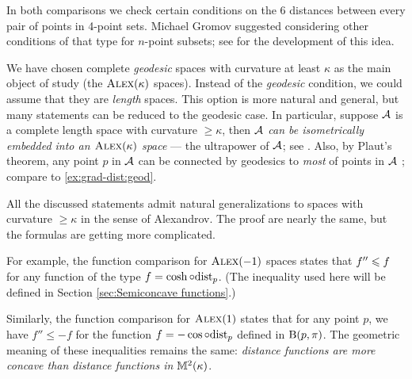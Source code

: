 In both comparisons we check certain conditions on the 6 distances between every pair of points in 4-point sets.
Michael Gromov \cite[Section 1.19$_+$]{gromov1999} suggested considering other conditions of that type for $n$-point subsets;
see \cite{toyoda,lebedeva-petrunin-zolotov,lebedeva2019,petrunin2017,lebedeva-petrunin2024,lebedeva-petrunin2023,lebedeva-petrunin2021,lebedeva-petrunin2025,eskenazis-mendel-naor,gromov2001} for the development of this idea.

We have chosen complete \textit{geodesic} spaces with curvature at least $\kappa$ as the main object of study (the $\textsc{Alex}(\kappa)$ spaces).
Instead of the \textit{geodesic} condition, we could assume that they are \textit{length} spaces. 
This option is more natural and general, but many statements can be reduced to the geodesic case.
In particular, suppose $\mathcal{A}$ is a complete length space with curvature $\ge \kappa$,
then 
\textit{$\mathcal{A}$ can be isometrically embedded into an $\textsc{Alex}(\kappa)$ space} --- the ultrapower of $\mathcal{A}$; see \cite[4.11+8.4]{alexander-kapovitch-petrunin2024}.
Also, by Plaut's theorem, any point $p$ in $\mathcal{A}$ can be connected by geodesics to \textit{most} of points in $\mathcal{A}$
\cite[8.11]{alexander-kapovitch-petrunin2024}; compare to \ref{ex:grad-dist:geod}.

All the discussed statements admit natural generalizations to 
spaces with curvature $\ge \kappa$ in the sense of Alexandrov.
The proof are nearly the same, but the formulas are getting more complicated.

For example, the function comparison for $\textsc{Alex}(-1)$ spaces states that 
$f''\leqslant f$ for any function of the type $f=\cosh\circ\mathrm{dist}_p$.
(The inequality used here will be defined in Section \ref{sec:Semiconcave functions}.)

Similarly, the function comparison for $\textsc{Alex}(1)$ states that for any point $p$, we have
$f''\le -f$ for the function $f=-\cos\circ\mathrm{dist}_p$
defined in $\mathrm{B}{}(p,\pi)$.
The geometric meaning of these inequalities remains the same:
\textit{distance functions are more concave than distance functions in $\mathbb{M}^2(\kappa)$}.

